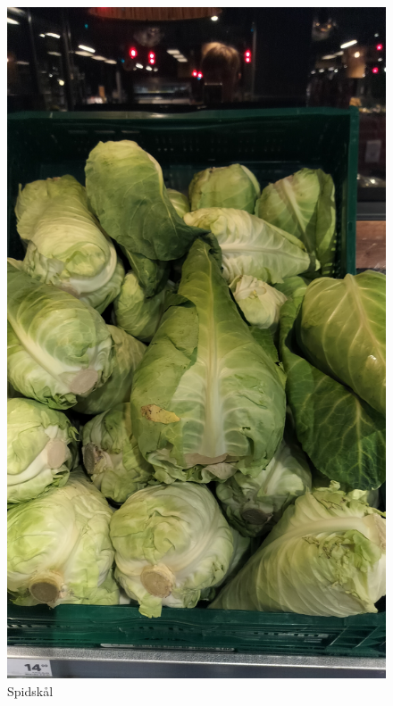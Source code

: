 \documentclass{book}
\begin{document}
\begin{figure}
    \centering
    \includegraphics[width=0.5\linewidth]{Billeder/Arbitær/Spidskål.jpg}
    \caption{Spidskål}
\end{figure}

\end{document}
